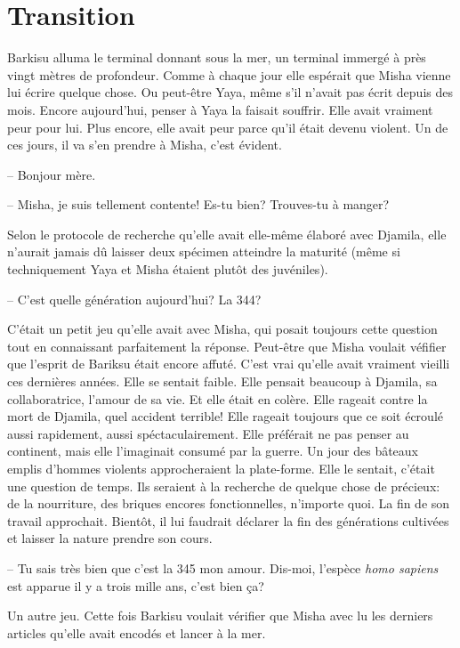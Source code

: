 \chapter{Transition}

Barkisu alluma le terminal donnant sous la mer, un terminal immergé à près
vingt mètres de profondeur. 
%
Comme à chaque jour elle espérait que Misha vienne lui écrire quelque chose.  
%
Ou peut-être Yaya, même s'il n'avait pas écrit depuis des mois.  
% 
Encore aujourd'hui, penser à Yaya la faisait souffrir.  
%
Elle avait vraiment
peur pour lui. 
%
Plus encore, elle avait peur parce qu'il était devenu violent. 
%
Un de ces jours, il va s'en prendre à Misha, c'est évident.

-- Bonjour mère.

-- Misha, je suis tellement contente! Es-tu bien? Trouves-tu à manger?

Selon le protocole de recherche qu'elle avait elle-même élaboré avec Djamila,
elle n'aurait jamais dû laisser deux spécimen atteindre la maturité (même si techniquement Yaya et Misha étaient plutôt des juvéniles).
%

-- C'est quelle génération aujourd'hui? La 344?

C'était un petit jeu qu'elle avait avec Misha, qui posait toujours cette
question tout en connaissant parfaitement la réponse.
%
Peut-être que Misha voulait véfifier que l'esprit de Bariksu était encore affuté.
%
C'est vrai qu'elle avait vraiment vieilli ces dernières années. 
%
Elle se sentait faible.
% 
Elle pensait beaucoup à Djamila, sa collaboratrice, l'amour de sa vie.
%
Et elle était en colère.
%
Elle rageait contre la mort de Djamila, quel accident terrible!
%
Elle rageait toujours que \nomProjet{} ce soit écroulé aussi rapidement, aussi
spéctaculairement.
%
Elle préférait ne pas penser au continent, mais elle l'imaginait consumé par la
guerre.
%
Un jour des bâteaux emplis d'hommes violents approcheraient la plate-forme.
Elle le sentait, c'était une question de temps. 
Ils seraient à la recherche de quelque chose de précieux: de la nourriture, des briques encores fonctionnelles, n'importe
quoi.
%
La fin de son travail approchait. 
%
Bientôt, il lui faudrait déclarer la fin des générations cultivées et laisser la nature prendre son cours.
%

-- Tu sais très bien que c'est la 345 mon amour. Dis-moi, l'espèce \textit{homo sapiens} est apparue il y a trois mille ans, c'est bien ça?

Un autre jeu. 
%
Cette fois Barkisu voulait vérifier que Misha avec lu les derniers articles qu'elle avait
encodés et lancer à la mer.
%

